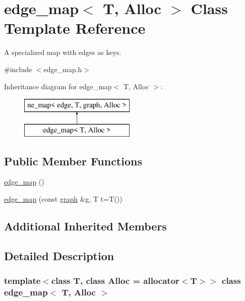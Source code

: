 \hypertarget{classedge__map}{}\section{edge\+\_\+map$<$ T, Alloc $>$ Class Template Reference}
\label{classedge__map}


A specialized map with edges as keys.  




{\ttfamily \#include $<$edge\+\_\+map.\+h$>$}

Inheritance diagram for edge\+\_\+map$<$ T, Alloc $>$\+:\begin{figure}[H]
\begin{center}
\leavevmode
\includegraphics[height=2.000000cm]{classedge__map}
\end{center}
\end{figure}
\subsection*{Public Member Functions}
\begin{DoxyCompactItemize}
\item 
\mbox{\hyperlink{classedge__map_a947fa280ba03fd11b1813d484572e6df}{edge\+\_\+map}} ()
\item 
\mbox{\hyperlink{classedge__map_a30bd07fe13081b22071b721f66bb6796}{edge\+\_\+map}} (const \mbox{\hyperlink{classgraph}{graph}} \&g, T t=T())
\end{DoxyCompactItemize}
\subsection*{Additional Inherited Members}


\subsection{Detailed Description}
\subsubsection*{template$<$class T, class Alloc = allocator$<$\+T$>$$>$\newline
class edge\+\_\+map$<$ T, Alloc $>$}

